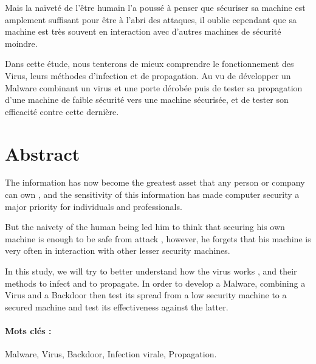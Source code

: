 \documentclass[12pt]{report}
\begin{document}
Mais la naïveté de l’être humain l’a poussé à penser que sécuriser sa machine est amplement suffisant pour être à l’abri des attaques, il oublie cependant que sa machine est très souvent en interaction avec d’autres machines de sécurité moindre.

Dans cette étude, nous tenterons de mieux comprendre le fonctionnement des Virus, leurs méthodes d'infection et de propagation. Au vu de développer un Malware combinant un virus et une porte dérobée puis de tester sa propagation d'une machine de faible sécurité vers une machine sécurisée, et de tester son efficacité contre cette dernière. %

\section*{Abstract}
The information has now become the greatest asset that any person or company can own , and the sensitivity of this information has made computer security a major priority for individuals and professionals.

But the naivety of the human being led him to think that securing his own machine is  enough to be safe from attack , however, he forgets that his machine is very often in interaction with other lesser security machines.

In this study, we will try to better understand how the virus works , and their methods to infect and to propagate. In order to develop a Malware, combining a Virus and a Backdoor then test its spread from a low security machine to a secured machine and test its effectiveness against the latter. %

\paragraph{Mots clés :} Malware, Virus, Backdoor, Infection virale, Propagation.
\end{document}
